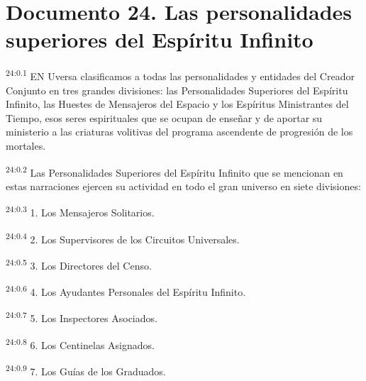 \chapter{Documento 24. Las personalidades superiores del Espíritu Infinito}
\par
\textsuperscript{24:0.1} EN Uversa clasificamos a todas las personalidades y entidades del Creador Conjunto en tres grandes divisiones: las Personalidades Superiores del Espíritu Infinito, las Huestes de Mensajeros del Espacio y los Espíritus Ministrantes del Tiempo, esos seres espirituales que se ocupan de enseñar y de aportar su ministerio a las criaturas volitivas del programa ascendente de progresión de los mortales.

\par
\textsuperscript{24:0.2} Las Personalidades Superiores del Espíritu Infinito que se mencionan en estas narraciones ejercen su actividad en todo el gran universo en siete divisiones:

\par
\textsuperscript{24:0.3} 1. Los Mensajeros Solitarios.

\par
\textsuperscript{24:0.4} 2. Los Supervisores de los Circuitos Universales.

\par
\textsuperscript{24:0.5} 3. Los Directores del Censo.

\par
\textsuperscript{24:0.6} 4. Los Ayudantes Personales del Espíritu Infinito.

\par
\textsuperscript{24:0.7} 5. Los Inspectores Asociados.

\par
\textsuperscript{24:0.8} 6. Los Centinelas Asignados.

\par
\textsuperscript{24:0.9} 7. Los Guías de los Graduados.

